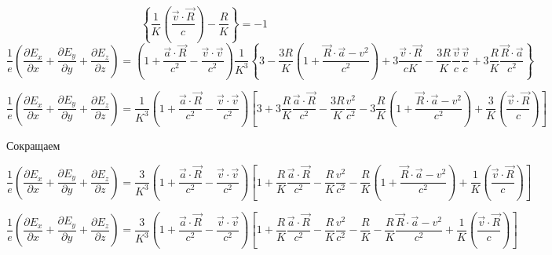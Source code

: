 \documentclass[11pt]{article}
\begin{document}
\[\left\{ \frac{1}{K}\left( \frac{\overrightarrow{v}\cdot \overrightarrow{R}}{c} \right)-\frac{R}{K} \right\}=-1\]
\[\frac{1}{e}\left( \frac{\partial {{E}_{x}}}{\partial x}+\frac{\partial {{E}_{y}}}{\partial y}+\frac{\partial {{E}_{z}}}{\partial z} \right)=\left( 1+\frac{\overrightarrow{a}\cdot \overrightarrow{R}}{{{c}^{2}}}-\frac{\overrightarrow{v}\cdot \overrightarrow{v}}{{{c}^{2}}} \right)\frac{1}{{{K}^{3}}}\left\{ 3-\frac{3R}{K}\left( 1+\frac{\overrightarrow{R}\cdot \overrightarrow{a}-{{v}^{2}}}{{{c}^{2}}} \right)+3\frac{\overrightarrow{v}\cdot \overrightarrow{R}}{cK}-\frac{3R}{K}\frac{\overrightarrow{v}}{c}\frac{\overrightarrow{v}}{c}+3\frac{R}{K}\frac{\overrightarrow{R}\cdot \overrightarrow{a}}{{{c}^{2}}} \right\}\]

\[\frac{1}{e}\left( \frac{\partial {{E}_{x}}}{\partial x}+\frac{\partial {{E}_{y}}}{\partial y}+\frac{\partial {{E}_{z}}}{\partial z} \right)=\frac{1}{{{K}^{3}}}\left( 1+\frac{\overrightarrow{a}\cdot \overrightarrow{R}}{{{c}^{2}}}-\frac{\overrightarrow{v}\cdot \overrightarrow{v}}{{{c}^{2}}} \right)\left[ 3+3\frac{R}{K}\frac{\overrightarrow{a}\cdot \overrightarrow{R}}{{{c}^{2}}}-\frac{3R}{K}\frac{{{v}^{2}}}{{{c}^{2}}}-3\frac{R}{K}\left( 1+\frac{\overrightarrow{R}\cdot \overrightarrow{a}-{{v}^{2}}}{{{c}^{2}}} \right)+\frac{3}{K}\left( \frac{\overrightarrow{v}\cdot \overrightarrow{R}}{c} \right) \right]\]

Сокращаем

\[\frac{1}{e}\left( \frac{\partial {{E}_{x}}}{\partial x}+\frac{\partial {{E}_{y}}}{\partial y}+\frac{\partial {{E}_{z}}}{\partial z} \right)=\frac{3}{{{K}^{3}}}\left( 1+\frac{\overrightarrow{a}\cdot \overrightarrow{R}}{{{c}^{2}}}-\frac{\overrightarrow{v}\cdot \overrightarrow{v}}{{{c}^{2}}} \right)\left[ 1+\frac{R}{K}\frac{\overrightarrow{a}\cdot \overrightarrow{R}}{{{c}^{2}}}-\frac{R}{K}\frac{{{v}^{2}}}{{{c}^{2}}}-\frac{R}{K}\left( 1+\frac{\overrightarrow{R}\cdot \overrightarrow{a}-{{v}^{2}}}{{{c}^{2}}} \right)+\frac{1}{K}\left( \frac{\overrightarrow{v}\cdot \overrightarrow{R}}{c} \right) \right]\]

\[\frac{1}{e}\left( \frac{\partial {{E}_{x}}}{\partial x}+\frac{\partial {{E}_{y}}}{\partial y}+\frac{\partial {{E}_{z}}}{\partial z} \right)=\frac{3}{{{K}^{3}}}\left( 1+\frac{\overrightarrow{a}\cdot \overrightarrow{R}}{{{c}^{2}}}-\frac{\overrightarrow{v}\cdot \overrightarrow{v}}{{{c}^{2}}} \right)\left[ 1+\frac{R}{K}\frac{\overrightarrow{a}\cdot \overrightarrow{R}}{{{c}^{2}}}-\frac{R}{K}\frac{{{v}^{2}}}{{{c}^{2}}}-\frac{R}{K}-\frac{R}{K}\frac{\overrightarrow{R}\cdot \overrightarrow{a}-{{v}^{2}}}{{{c}^{2}}}+\frac{1}{K}\left( \frac{\overrightarrow{v}\cdot \overrightarrow{R}}{c} \right) \right]\]
\end{document}
